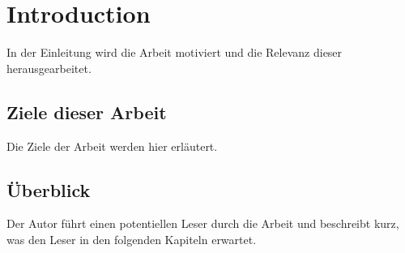 \chapter{Introduction}
In der Einleitung wird die Arbeit motiviert und die Relevanz dieser herausgearbeitet.

\section{Ziele dieser Arbeit}
Die Ziele der Arbeit werden hier erläutert. 

\section{Überblick}
Der Autor führt einen potentiellen Leser durch die Arbeit und beschreibt kurz, was den Leser in den folgenden Kapiteln erwartet.

